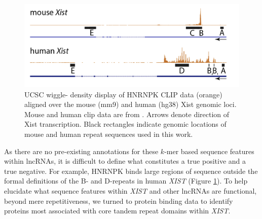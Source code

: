 \begin{figure}[h!]
\centering
\includegraphics[width=\textwidth]{images/hnkmousehuman.png}
\caption[HNRNPK enrichment relative tandem repeat locations in human \emph{XIST} and mouse \emph{Xist}.]{UCSC wiggle- density display of HNRNPK CLIP data (orange) aligned over the mouse (mm9) and human (hg38) Xist genomic loci. Mouse and human clip data are from \cite{Cirillo2016QuantitativeEditor,VanNostrand2016RobusteCLIP}. Arrows denote direction of Xist transcription. Black rectangles indicate genomic locations of mouse and human repeat sequences used in this work.}
\label{fig:hnkhumanmouse}
\end{figure}

As there are no pre-existing annotations for these $k$-mer based sequence features within lncRNAs, it is difficult to define what constitutes a true positive and a true negative. For example, HNRNPK binds large regions of sequence outside the formal definitions of the B- and D-repeats in human \textit{XIST} (Figure \ref{fig:hnkhumanmouse}). To help elucidate what sequence features within \emph{XIST} and other lncRNAs are functional, beyond mere repetitiveness, we turned to protein binding data to identify proteins most associated with core tandem repeat domains within \textit{XIST}. 

